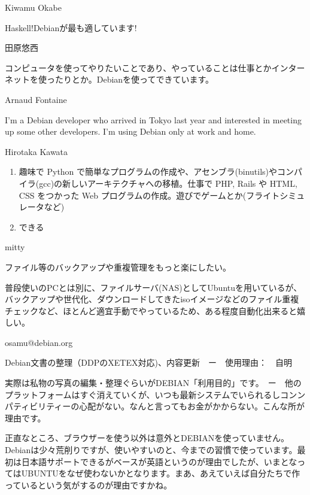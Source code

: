 \begin{prework}{ Kiwamu Okabe }

Haskell!Debianが最も適しています!

\end{prework}

\begin{prework}{ 田原悠西 }

コンピュータを使ってやりたいことであり、やっていることは仕事とかインターネットを使ったりとか。Debianを使ってできています。

\end{prework}

\begin{prework}{ Arnaud Fontaine }

I'm a Debian developer who arrived in Tokyo last year and interested in meeting up some other developers. I'm using Debian only at work and home.

\end{prework}

\begin{prework}{ Hirotaka Kawata }

\begin{enumerate}
\item 趣味で Python で簡単なプログラムの作成や、アセンブラ(binutils)やコンパイラ(gcc)の新しいアーキテクチャへの移植。仕事で PHP, Rails や HTML, CSS をつかった Web プログラムの作成。遊びでゲームとか(フライトシミュレータなど)
\item できる
\end{enumerate}

\end{prework}

\begin{prework}{ mitty }

ファイル等のバックアップや重複管理をもっと楽にしたい。

普段使いのPCとは別に、ファイルサーバ(NAS)としてUbuntuを用いているが、バックアップや世代化、ダウンロードしてきたisoイメージなどのファイル重複チェックなど、ほとんど適宜手動でやっているため、ある程度自動化出来ると嬉しい。
\end{prework}

\begin{prework}{ osamu@debian.org }

Debian文書の整理（DDPのXETEX対応)、内容更新　ー　使用理由：　自明

実際は私物の写真の編集・整理ぐらいがDEBIAN「利用目的」です。　ー　他のプラットフォームはすぐ消えていくが、いつも最新システムでいられるしコンンパティビリティーの心配がない。なんと言ってもお金がかからない。こんな所が理由です。

正直なところ、ブラウザーを使う以外は意外とDEBIANを使っていません。Debianは少々荒削りですが、使いやすいのと、今までの習慣で使っています。最初は日本語サポートできるがベースが英語というのが理由でしたが、いまとなってはUBUNTUをなぜ使わないかとなります。まあ、あえていえば自分たちで作っているという気がするのが理由ですかね。
\end{prework}

